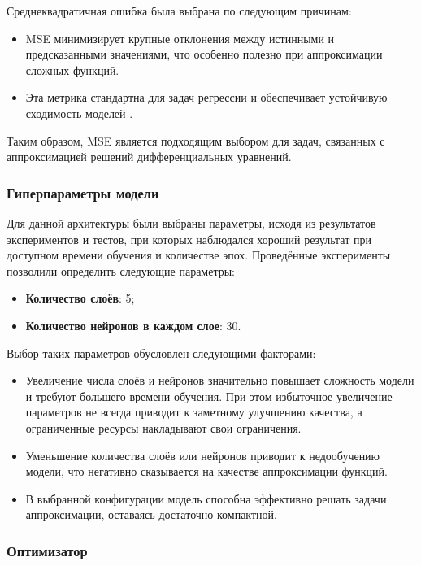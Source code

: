 Среднеквадратичная ошибка была выбрана по следующим причинам:
\begin{itemize}
    \item MSE минимизирует крупные отклонения между истинными и предсказанными значениями, что особенно полезно при аппроксимации сложных функций.
    \item Эта метрика стандартна для задач регрессии и обеспечивает устойчивую сходимость моделей \cite{Goodfellow}.
\end{itemize}

Таким образом, MSE является подходящим выбором для задач, связанных с аппроксимацией решений дифференциальных уравнений.

\subsubsection{Гиперпараметры модели}

Для данной архитектуры были выбраны параметры, исходя из результатов экспериментов и тестов, при которых наблюдался хороший результат при доступном времени обучения и количестве эпох. Проведённые эксперименты позволили определить следующие параметры:
\begin{itemize}
    \item \textbf{Количество слоёв}: 5;
    \item \textbf{Количество нейронов в каждом слое}: 30.
\end{itemize}

Выбор таких параметров обусловлен следующими факторами:
\begin{itemize}
    \item Увеличение числа слоёв и нейронов значительно повышает сложность модели и требуют большего времени обучения. При этом избыточное увеличение параметров не всегда приводит к заметному улучшению качества, а ограниченные ресурсы накладывают свои ограничения.
    \item Уменьшение количества слоёв или нейронов приводит к недообучению модели, что негативно сказывается на качестве аппроксимации функций.
    \item В выбранной конфигурации модель способна эффективно решать задачи аппроксимации, оставаясь достаточно компактной.
\end{itemize}

\subsubsection{Оптимизатор}

